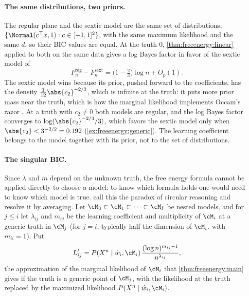 \begin{refsection}
\paragraph{The same distributions, two priors.} The regular plane and the sextic model are the same set of distributions, $\{\Normal(c^\top x,1):c\in[-1,1]^2\}$, with the same maximum likelihood and the same $d$, so their BIC values are equal. At the truth $0$, \cref{thm:freeenergy:linear} applied to both on the same data gives a log Bayes factor in favor of the sextic model of
\[
F_n^{\mathrm{reg}}-F_n^{\mathrm{sext}}=\bigl(1-\tfrac23\bigr)\log n+O_p(1).
\]
The sextic model wins because its prior, pushed forward to the coefficients, has the density $\frac1{12}\abs{c_2}^{-2/3}$, which is infinite at the truth: it puts more prior mass near the truth, which is how the marginal likelihood implements Occam's razor \parencite{MacKay1992}. At a truth with $c_2\ne0$ both models are regular, and the log Bayes factor converges to $\log(\abs{c_2}^{-2/3}/3)$, which favors the sextic model only when $\abs{c_2}<3^{-3/2}=0.192$ (\cref{ex:freeenergy:generic}). The learning coefficient belongs to the model together with its prior, not to the set of distributions.

\paragraph{The singular BIC.} Since $\lambda$ and $m$ depend on the unknown truth, the free energy formula cannot be applied directly to choose a model: to know which formula holds one would need to know which model is true. \textcite{DrtonPlummer2017} call this the paradox of circular reasoning and resolve it by averaging. Let $\cM_0\subset\cM_1\subset\dots\subset\cM_I$ be nested models, and for $j\le i$ let $\lambda_{ij}$ and $m_{ij}$ be the learning coefficient and multiplicity of $\cM_i$ at a generic truth in $\cM_j$ (for $j=i$, typically half the dimension of $\cM_i$, with $m_{ii}=1$). Put
\[
L'_{ij}=P(X^n\mid\hat w_i,\cM_i)\,\frac{(\log n)^{m_{ij}-1}}{n^{\lambda_{ij}}},
\]
the approximation of the marginal likelihood of $\cM_i$ that \cref{thm:freeenergy:main} gives if the truth is a generic point of $\cM_j$, with the likelihood at the truth replaced by the maximized likelihood $P(X^n\mid\hat w_i,\cM_i)$.


\end{refsection}
